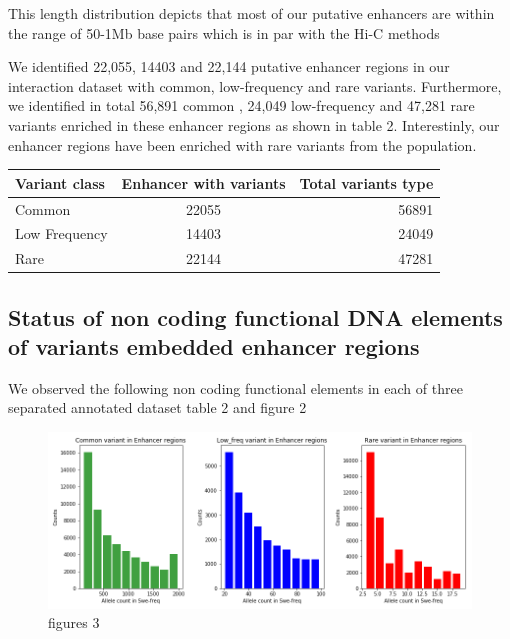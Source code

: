 \documentclass[11pt]{article} %
\begin{document}
This length distribution depicts that most of our putative enhancers are within the range of 50-1Mb base pairs which is in par with the Hi-C methods

We identified  22,055, 14403 and 22,144 putative enhancer regions in our interaction dataset with common, low-frequency and rare variants. Furthermore, we identified in total 56,891 common , 24,049 low-frequency and  47,281 rare variants enriched in these enhancer regions as shown in table 2. Interestinly, our enhancer regions have been enriched with rare variants from the population.

\begin{longtable}[]{@{}lcr@{}}
\toprule
Variant class & Enhancer with variants & Total variants
type\tabularnewline
\midrule
\endhead
Common & 22055 & 56891\tabularnewline
Low Frequency & 14403 & 24049\tabularnewline
Rare & 22144 & 47281\tabularnewline
\bottomrule
\end{longtable}


\subsection{Status of non coding functional DNA elements of variants embedded enhancer regions}

We observed the following non coding functional elements in each of three separated annotated dataset table 2 and figure 2

\begin{figure}[H]
\centering
\includegraphics[width=\textwidth]{../Enhancer_elements.png}
\caption{figures 3}
\end{figure}
\end{document}
